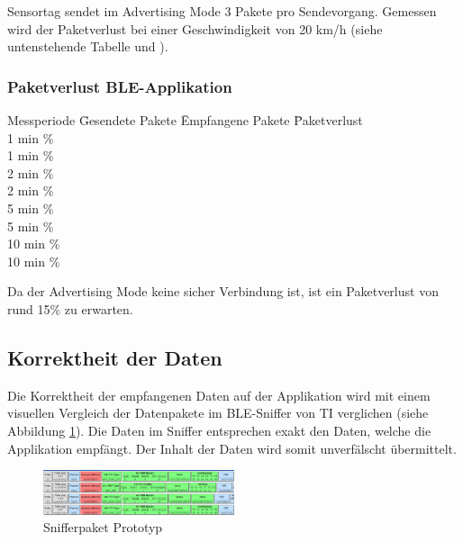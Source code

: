 Sensortag sendet im Advertising Mode 3 Pakete pro Sendevorgang. Gemessen wird der Paketverlust bei einer Geschwindigkeit von 20 km/h (siehe untenstehende Tabelle und ).   

\subsubsection*{Paketverlust BLE-Applikation}
\begin{tabbing}
    Messperiode \quad\= Gesendete Pakete \quad\= Empfangene Pakete \quad\= Paketverlust\\[0.8ex]
    1 min      \thinspace\%  \\
    1 min      \thinspace\%  \\
    2 min      \thinspace\%  \\
    2 min      \thinspace\%  \\
    5 min      \thinspace\%  \\
    5 min      \thinspace\%  \\
    10 min      \thinspace\%  \\
    10 min      \thinspace\%  \\
\end{tabbing} 

Da der Advertising Mode keine sicher Verbindung ist, ist ein Paketverlust von rund 15\thinspace\% zu erwarten.


\subsection{Korrektheit der Daten}

Die Korrektheit der empfangenen Daten auf der Applikation wird mit einem visuellen Vergleich der Datenpakete im BLE-Sniffer von TI verglichen (siehe Abbildung \ref{sniffer}).  Die Daten im Sniffer entsprechen exakt den Daten, welche die Applikation empfängt. Der Inhalt der Daten wird somit unverfälscht übermittelt.



\begin{figure}[ht]
    \includegraphics[width=0.5\textwidth]{4Resultate/imag/sniffer.png} 
    \caption{Snifferpaket Prototyp}
    \label{sniffer}
\end{figure}








